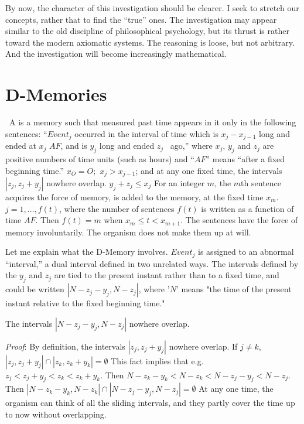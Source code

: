 By now, the character of this investigation should be clearer. I seek to 
stretch our concepts, rather that to find the \enquote{true} ones. The investigation 
may appear similar to the old discipline of philosophical psychology, but its 
thrust is rather toward the modern axiomatic systems. The reasoning is 
loose, but not arbitrary. And the investigation will become increasingly 
mathematical. 


\section{D-Memories}

\begin{hangers}
\ A  is a memory such that measured past time 
	appears in it only in the following sentences: \enquote{$Event_j$ occurred in the interval 
of time which is $x_j-x_{j-1}$ long and ended at $x_j$ $AF$, and is $y_j$ long and ended $z_j$
\ ago,} where $x_j$, $y_j$ and $z_j$ are positive numbers of time units (such as hours) 
and \enquote{$AF$} means \enquote{after a fixed beginning time.} $x_O=O;$ $x_j> x_{j-1}$; and at any 
one fixed time, the intervals $|z_j, z_j+y_j|$ nowhere overlap. $y_j+z_j\leq x_j$ For an
integer $m$, the $m$th sentence acquires the force of memory, is added to the 
memory, at the fixed time $x_m$. $j=1, \ldots, f(t)$, where the number of sentences 
$f(t)$ is written as a function of time $AF$. Then $f(t)=m$ when $x_m \leq t \less x_{m+1}$. 
The sentences have the force of memory involuntarily. The organism does 
not make them up at will. 
\end{hangers}

Let me explain what the D-Memory involves. $Event_j$ is assigned to an 
abnormal \enquote{interval,} a dual interval defined in two unrelated ways. The 
intervals defined by the $y_j$ and $z_j$ are tied to the present instant rather than to 
a fixed time, and could be written $|N-z_j-y_j, N-z_j|$, where '$N$' means "the time 
of the present instant relative to the fixed beginning time." 

\newcommand{\proof}{\textit{Proof}}

\begin{hangers}
 The intervals $|N-z_j-y_j, N-z_j|$ nowhere overlap. 

\proof: By definition, the intervals $|z_j, z_j+y_j|$ nowhere overlap. If $j\neq k$,
$|z_j, z_j+y_j|\cap|z_k, z_k+y_k|=\emptyset$ 
This fact implies that e.g. $z_j\less z_j+y_j\less z_k\less z_k+y_k$.
Then $N-z_k-y_k\less N-z_k\less N-z_j-y_j\less N-z_j$.
Then $|N-z_k-y_k, N-z_k|\cap|N-z_j-y_j, N-z_j|=\emptyset$
At any one time, the organism can think of all the sliding intervals, and they 
partly cover the time up to now without overlapping. 
\end{hangers}

